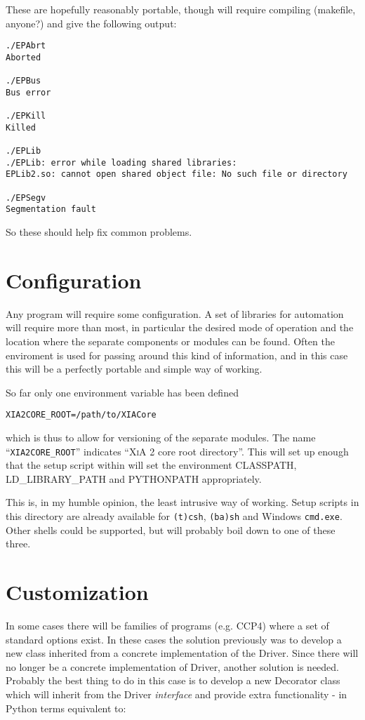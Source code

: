 \documentclass[a4paper, 11pt]{article}
\begin{document}
These are hopefully reasonably portable, though will require compiling 
(makefile, anyone?) and give the following output:

\begin{verbatim}
./EPAbrt 
Aborted

./EPBus 
Bus error

./EPKill 
Killed

./EPLib
./EPLib: error while loading shared libraries: 
EPLib2.so: cannot open shared object file: No such file or directory

./EPSegv 
Segmentation fault
\end{verbatim}

So these should help fix common problems.

\section{Configuration}

Any program will require some configuration. A set of libraries for automation
will require more than most, in particular the desired mode of operation and
the location where the separate components or modules can be found. Often the
enviroment is used for passing around this kind of information, and in this
case this will be a perfectly portable and simple way of working.

So far only one environment variable has been defined

\begin{verbatim}
XIA2CORE_ROOT=/path/to/XIACore
\end{verbatim}

\noindent
which is thus to allow for versioning of the separate modules. The name
``\verb|XIA2CORE_ROOT|'' indicates ``\textsc{XiA 2} core root directory''. This
will set up enough that the setup script within will set the environment
CLASSPATH, LD\_LIBRARY\_PATH and PYTHONPATH appropriately.

This is, in my humble opinion, the least intrusive way of working. Setup
scripts in this directory are already available for \verb|(t)csh|,
\verb|(ba)sh| and Windows \verb|cmd.exe|. Other shells could be supported, but
will probably boil down to one of these three.

\section{Customization}

In some cases there will be families of programs (e.g. CCP4) where a set of
standard options exist. In these cases the solution previously was to develop
a new class inherited from a concrete implementation of the Driver. Since
there will no longer be a concrete implementation of Driver, another solution
is needed. Probably the best thing to do in this case is to develop a new
Decorator class which will inherit from the Driver \emph{interface} and
provide extra functionality - in Python terms equivalent to:
\end{document}
